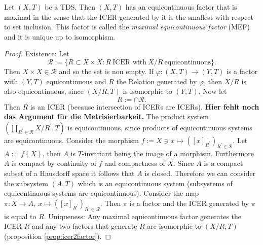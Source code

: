 \begin{theorem}
  Let $(X,T)$ be a TDS.
  Then $(X,T)$ has an equicontinuous factor that is maximal in the sense that the ICER generated by it is the smallest with respect to set inclusion. This factor is called the \emph{maximal equicontinuous factor} (MEF) and it is unique up to isomorphism.
\end{theorem}
\begin{proof}
  Existence:
  Let
  \begin{equation*}
    \mathcal{R} := \{ R \subset X \times X : R \ \text{ICER with} \ X/R \ \text{equicontinuous}\}.
  \end{equation*}
  Then $ X \times X \in \mathcal{R}$ and so the set is non empty.
  If $\varphi : (X,T)\to (Y,T)$ is a factor with $(Y,T)$ equicontinuous and $R$ the Relation generated by $\varphi$, then $X/R$ is also equicontinuous, since $(X/R,T)$ is isomorphic to $(Y,T)$.
  Now let 
  \begin{equation*}
    R:= \cap \mathcal{R}.
  \end{equation*}
  Then $R$ is an ICER (because intersection of ICERs are ICERs).
  \textbf{Hier fehlt noch das Argument für die Metrisierbarkeit.}
  The product system $(\prod_{R^\prime \in \mathcal{R}} X/R^\prime,T)$ is equicontinuous, since products of equicontinuous systems are equicontinuous.
Consider the morphism $f:= X \ni x  \mapsto ([x]_{R^\prime})_{R^\prime \in \mathcal{R}}$.
  Let $A:= f(X)$, then $A$ is $T$-invariant being the image of a morphism.
  Furthermore $A$ is compact by continuity of $f$ and compactness of $X$.
  Since $A$ is a compact subset of a Hausdorff space it follows that $A$ is closed.
  Therefore we can consider the subsystem $(A,T)$ which is an equicontinuous system (subsystems of equicontinuous systems are equicontinuous).
  Consider the map $\pi: X \to  A , \  x  \mapsto ([x]_{R^\prime})_{R^\prime \in \mathcal{R}}$.
  Then $\pi$ is a factor and the ICER generated by $\pi$ is equal to $R$.
  Uniqueness:
  Any maximal equicontinuous factor generates the ICER $R$ and any two factors that generate $R$ are isomorphic to $(X/R,T)$ (proposition \ref{prop:icer2factor}).
\end{proof}
